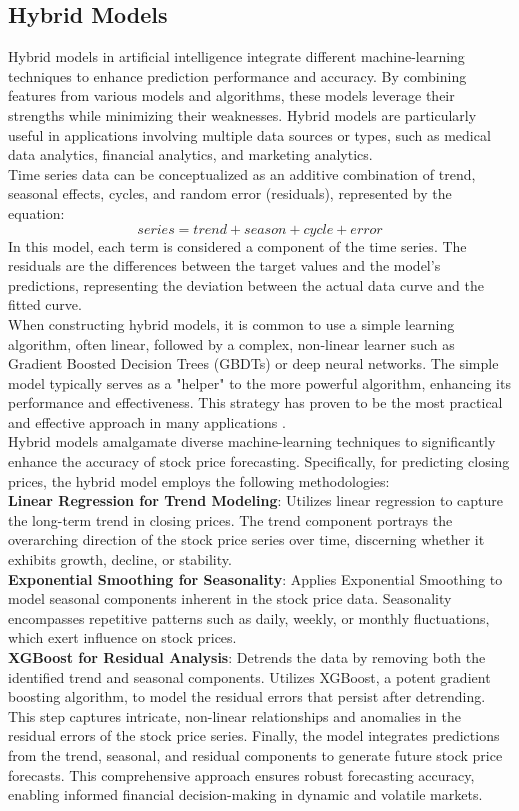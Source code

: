 \documentclass{ieeeojies}
\begin{document}
\subsection{Hybrid Models}
Hybrid models in artificial intelligence integrate different machine-learning techniques to enhance prediction performance and accuracy. By combining features from various models and algorithms, these models leverage their strengths while minimizing their weaknesses. Hybrid models are particularly useful in applications involving multiple data sources or types, such as medical data analytics, financial analytics, and marketing analytics.\\
Time series data can be conceptualized as an additive combination of trend, seasonal effects, cycles, and random error (residuals), represented by the equation:
\[
series = trend + season + cycle + error
\]
In this model, each term is considered a component of the time series. The residuals are the differences between the target values and the model's predictions, representing the deviation between the actual data curve and the fitted curve.\\
When constructing hybrid models, it is common to use a simple learning algorithm, often linear, followed by a complex, non-linear learner such as Gradient Boosted Decision Trees (GBDTs) or deep neural networks. The simple model typically serves as a "helper" to the more powerful algorithm, enhancing its performance and effectiveness. This strategy has proven to be the most practical and effective approach in many applications \cite{b18}.\\
Hybrid models amalgamate diverse machine-learning techniques to significantly enhance the accuracy of stock price forecasting. Specifically, for predicting closing prices, the hybrid model employs the following methodologies:\\
\textbf{Linear Regression for Trend Modeling}:
Utilizes linear regression to capture the long-term trend in closing prices. The trend component portrays the overarching direction of the stock price series over time, discerning whether it exhibits growth, decline, or stability.\\
\textbf{Exponential Smoothing for Seasonality}: Applies Exponential Smoothing to model seasonal components inherent in the stock price data. Seasonality encompasses repetitive patterns such as daily, weekly, or monthly fluctuations, which exert influence on stock prices.\\
\textbf{XGBoost for Residual Analysis}: Detrends the data by removing both the identified trend and seasonal components. Utilizes XGBoost, a potent gradient boosting algorithm, to model the residual errors that persist after detrending. This step captures intricate, non-linear relationships and anomalies in the residual errors of the stock price series.
Finally, the model integrates predictions from the trend, seasonal, and residual components to generate future stock price forecasts. This comprehensive approach ensures robust forecasting accuracy, enabling informed financial decision-making in dynamic and volatile markets.
\end{document}
